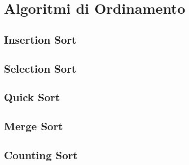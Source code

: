 \chapter{Algoritmi di Ordinamento}

\section{Insertion Sort}

\section{Selection Sort}

\section{Quick Sort}

\section{Merge Sort}

\section{Counting Sort}